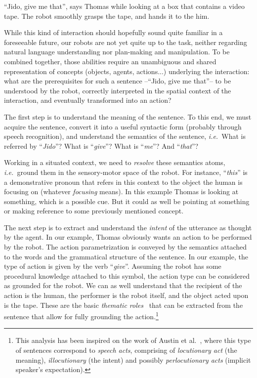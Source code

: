 \documentclass[twocolumn]{svjour3}
\newcommand{\ie}{{\textit{i.e.~}}}
\begin{document}
``Jido, give me that'', says Thomas while looking at a box that contains a
video tape. The robot smoothly grasps the tape, and hands it to the him.

While this kind of interaction should hopefully sound quite familiar in a
foreseeable future, our robots are not yet quite up to the task, neither
regarding natural language understanding nor plan-making and manipulation.
To be combined together, those abilities require an unambiguous and shared
representation of concepts (objects, agents, actions...) underlying the
interaction: what are the prerequisites for such a sentence --``Jido,
give me that''-- to be understood by the robot, correctly interpreted in the
spatial context of the interaction, and eventually transformed into an action?

The first step is to understand the meaning of the sentence. To this end, we must acquire the sentence, convert it into a useful syntactic form (probably through
speech recognition), and understand the semantics of the sentence, \ie What is
referred by ``\textit{Jido}''? What is ``\textit{give}''? What is
``\textit{me}''? And ``\textit{that}''?

Working in a situated context, we need to \emph{resolve} these
semantics atoms, \ie ground them in the sensory-motor space of the robot. For
instance, ``\textit{this}'' is a demonstrative pronoun that refers in this
context to the object the human is focusing on (whatever \textit{focusing}
means). In this example Thomas is looking at something, which is a possible
cue. But it could as well be pointing at something or making reference to some
previously mentioned concept. 

The next step is to extract and understand the \emph{intent} of the utterance
as thought by the agent. In our example, Thomas obviously wants an action to be performed by the robot. The action parametrization is conveyed by the semantics attached to the words and the grammatical structure of the sentence. In our example, the type of action is
given by the verb ``\textit{give}''. Assuming the robot has some procedural
knowledge attached to this symbol, the action type can be considered as
grounded for the robot. We can as well understand that the recipient of the
action is the human, the performer is the robot itself, and the object acted
upon is the tape. These are the basic \emph{thematic roles}~\cite{Gruber1965}
that can be extracted from the sentence that allow for fully grounding the action.\footnote{This analysis has been inspired on the work of Austin et al.~\cite{Austin1962}, where this type of sentences correspond to \emph{speech acts}, comprising of \emph{locutionary act} (the meaning), \emph{illocutionary} (the intent) and possibly \emph{perlocutionary acts} (implicit speaker's expectation).}
\end{document}

